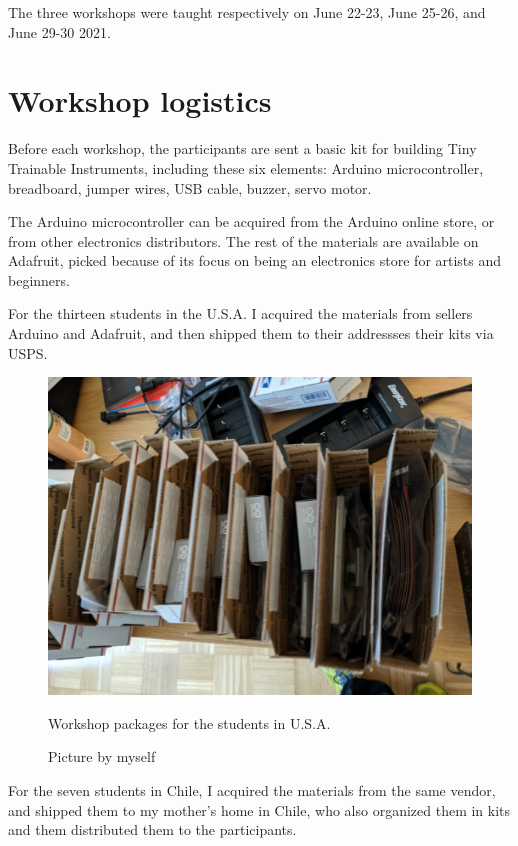 The three workshops were taught respectively on June 22-23, June 25-26, and June 29-30 2021.

\section{Workshop logistics}

Before each workshop, the participants are sent a basic kit for building Tiny Trainable Instruments, including these six elements: Arduino microcontroller, breadboard, jumper wires, USB cable, buzzer, servo motor.

The Arduino microcontroller can be acquired from the Arduino online store, or from other electronics distributors. The rest of the materials are available on Adafruit, picked because of its focus on being an electronics store for artists and beginners.

For the thirteen students in the U.S.A. I acquired the materials from sellers Arduino and Adafruit, and then shipped them to their addressses their kits via \acrfull{USPS}.

\begin{figure}[ht]
  \centering
  \includegraphics[width=0.75\linewidth,height=0.25\textheight,keepaspectratio]{images/workshop-packages.jpg}
  \caption{Workshop packages for the students in U.S.A.}
  \caption*{Picture by myself}
  \label{fig:workshop-packages-usa}
\end{figure}

For the seven students in Chile, I acquired the materials from the same vendor, and shipped them to my mother's home in Chile, who also organized them in kits and them distributed them to the participants.

